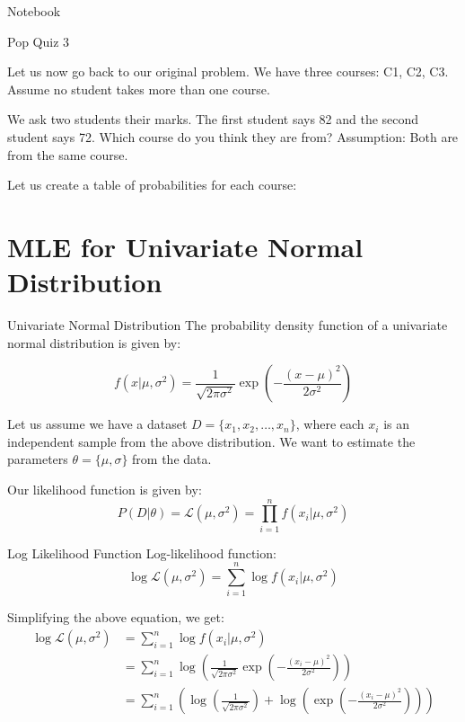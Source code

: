 \documentclass[handout]{beamer}
\begin{document}
\begin{frame}
    Notebook
\end{frame}

\begin{frame}{Pop Quiz 3}


Let us now go back to our original problem. We have three courses: C1, C2, C3. Assume no student takes more than one course.

We ask two students their marks. The first student says 82 and the second student says 72. Which course do you think they are from? Assumption: Both are from the same course.

Let us create a table of probabilities for each course:




    
\end{frame}

\section{MLE for Univariate Normal Distribution}

\begin{frame}{Univariate Normal Distribution}
The probability density function of a univariate normal distribution is given by:

\begin{equation}
f(x|\mu, \sigma^2) = \frac{1}{\sqrt{2\pi\sigma^2}}\exp\left(-\frac{(x-\mu)^2}{2\sigma^2}\right)
\end{equation}

Let us assume we have a dataset $D = \{x_1, x_2, \ldots, x_n\}$, where each $x_i$ is an independent sample from the above distribution. 
We want to estimate the parameters $\theta = \{\mu, \sigma\}$ from the data.

Our likelihood function is given by:
\begin{equation}
P(D|\theta) = \mathcal{L}(\mu, \sigma^2) = \prod_{i=1}^n f(x_i|\mu, \sigma^2)
\end{equation}


\end{frame}

\begin{frame}{Log Likelihood Function}
    Log-likelihood function:
    \begin{equation}
        \log \mathcal{L}(\mu, \sigma^2) = \sum_{i=1}^n \log f(x_i|\mu, \sigma^2)
    \end{equation}

    Simplifying the above equation, we get:
    \begin{align*}
        \log \mathcal{L}(\mu, \sigma^2) &= \sum_{i=1}^n \log f(x_i|\mu, \sigma^2) \\
        &= \sum_{i=1}^n \log \left( \frac{1}{\sqrt{2\pi\sigma^2}} \exp \left( -\frac{(x_i-\mu)^2}{2\sigma^2} \right) \right) \\
        &= \sum_{i=1}^n \left( \log \left( \frac{1}{\sqrt{2\pi\sigma^2}} \right) + \log \left( \exp \left( -\frac{(x_i-\mu)^2}{2\sigma^2} \right) \right) \right) \\
        \end{align*}
\end{frame}
\end{document}
